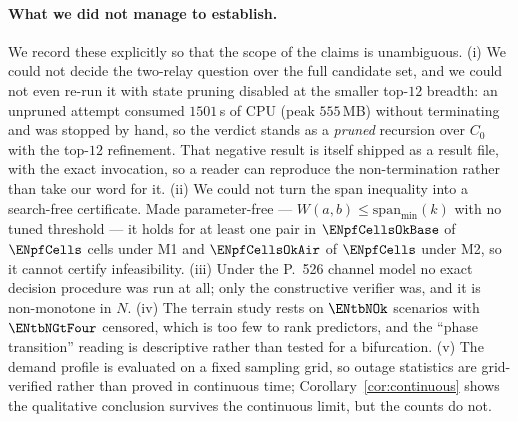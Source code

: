 \documentclass[11pt]{article}
\theoremstyle{dshplain}
\theoremstyle{dshdefn}
\begin{document}
\paragraph{What we did not manage to establish.}
We record these explicitly so that the scope of the claims is unambiguous.
(i) We could not decide the two-relay question over the full candidate set, and we
could not even re-run it with state pruning disabled at the smaller top-$12$
breadth: an unpruned attempt consumed $1501$\,s of CPU (peak $555$\,MB) without
terminating and was stopped by hand, so the verdict stands as a
\emph{pruned} recursion over $C_0$ with the top-$12$ refinement. That negative
result is itself shipped as a result file, with the exact invocation, so a reader
can reproduce the non-termination rather than take our word for it. (ii) We could
not turn the span inequality into a search-free certificate. Made parameter-free
---
$W(a,b)\le\mathrm{span}_{\min}(k)$ with no tuned threshold --- it holds for at
least one pair in $\ENpfCellsOkBase$ of $\ENpfCells$ cells under M1 and
$\ENpfCellsOkAir$ of $\ENpfCells$ under M2, so it cannot certify infeasibility.
(iii) Under the P.~526 channel model no exact decision procedure was run at all;
only the constructive verifier was, and it is non-monotone in $N$. (iv) The
terrain study rests on $\ENtbNOk$ scenarios with $\ENtbNGtFour$ censored, which is
too few to rank predictors, and the ``phase transition'' reading is descriptive
rather than tested for a bifurcation. (v) The demand profile is evaluated on a
fixed sampling grid, so outage statistics are grid-verified rather than proved in
continuous time; Corollary~\ref{cor:continuous} shows the qualitative conclusion
survives the continuous limit, but the counts do not.

\end{document}
